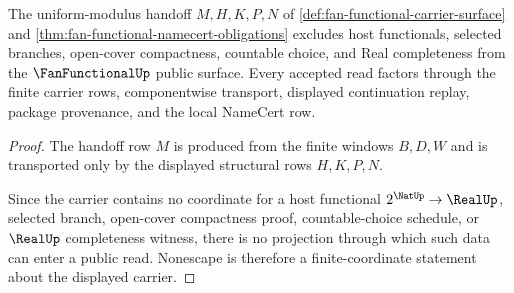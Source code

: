 \begin{theorem}
\label{thm:fanfunctional-obligation-modulus-nonescape}
The uniform-modulus handoff $M,H,K,P,N$ of
\autoref{def:fan-functional-carrier-surface} and
\autoref{thm:fan-functional-namecert-obligations} excludes host functionals,
selected branches, open-cover compactness, countable choice, and Real
completeness from the $\FanFunctionalUp$ public surface. Every accepted read
factors through the finite carrier rows, componentwise transport, displayed
continuation replay, package provenance, and the local NameCert row.
\end{theorem}
\begin{proof}
The handoff row $M$ is produced from the finite windows $B,D,W$ and is
transported only by the displayed structural rows $H,K,P,N$.

Since the carrier contains no coordinate for a host functional
$2^{\NatUp}\to\RealUp$, selected branch, open-cover compactness proof,
countable-choice schedule, or $\RealUp$ completeness witness, there is no
projection through which such data can enter a public read. Nonescape is
therefore a finite-coordinate statement about the displayed carrier.
\end{proof}

